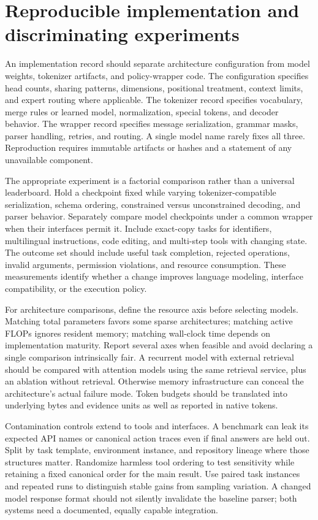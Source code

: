 \section{Reproducible implementation and discriminating experiments}
\label{sec:C03:experiments}
An implementation record should separate architecture configuration from model weights, tokenizer artifacts, and policy-wrapper code. The configuration specifies head counts, sharing patterns, dimensions, positional treatment, context limits, and expert routing where applicable. The tokenizer record specifies vocabulary, merge rules or learned model, normalization, special tokens, and decoder behavior. The wrapper record specifies message serialization, grammar masks, parser handling, retries, and routing. A single model name rarely fixes all three. Reproduction requires immutable artifacts or hashes and a statement of any unavailable component.

The appropriate experiment is a factorial comparison rather than a universal leaderboard. Hold a checkpoint fixed while varying tokenizer-compatible serialization, schema ordering, constrained versus unconstrained decoding, and parser behavior. Separately compare model checkpoints under a common wrapper when their interfaces permit it. Include exact-copy tasks for identifiers, multilingual instructions, code editing, and multi-step tools with changing state. The outcome set should include useful task completion, rejected operations, invalid arguments, permission violations, and resource consumption. These measurements identify whether a change improves language modeling, interface compatibility, or the execution policy.

For architecture comparisons, define the resource axis before selecting models. Matching total parameters favors some sparse architectures; matching active FLOPs ignores resident memory; matching wall-clock time depends on implementation maturity. Report several axes when feasible and avoid declaring a single comparison intrinsically fair. A recurrent model with external retrieval should be compared with attention models using the same retrieval service, plus an ablation without retrieval. Otherwise memory infrastructure can conceal the architecture's actual failure mode. Token budgets should be translated into underlying bytes and evidence units as well as reported in native tokens.

Contamination controls extend to tools and interfaces. A benchmark can leak its expected API names or canonical action traces even if final answers are held out. Split by task template, environment instance, and repository lineage where those structures matter. Randomize harmless tool ordering to test sensitivity while retaining a fixed canonical order for the main result. Use paired task instances and repeated runs to distinguish stable gains from sampling variation. A changed model response format should not silently invalidate the baseline parser; both systems need a documented, equally capable integration.

